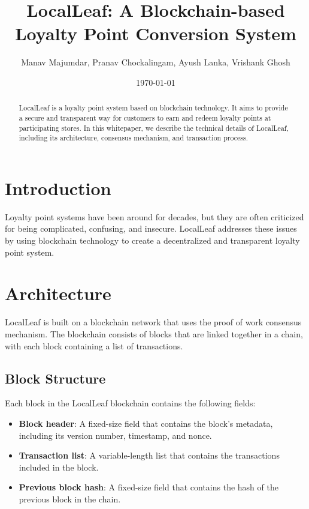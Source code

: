 \documentclass{article}
\title{LocalLeaf: A Blockchain-based Loyalty Point Conversion System}
\author{Manav Majumdar, Pranav Chockalingam, Ayush Lanka, Vrishank Ghosh}
\date{\today}
\begin{document}
\maketitle

\begin{abstract}
    LocalLeaf is a loyalty point system based on blockchain technology. It aims to provide a secure and transparent way for customers to earn and redeem loyalty points at participating stores. In this whitepaper, we describe the technical details of LocalLeaf, including its architecture, consensus mechanism, and transaction process.
\end{abstract}

\section{Introduction}

Loyalty point systems have been around for decades, but they are often criticized for being complicated, confusing, and insecure. LocalLeaf addresses these issues by using blockchain technology to create a decentralized and transparent loyalty point system.

\section{Architecture}

LocalLeaf is built on a blockchain network that uses the proof of work consensus mechanism. The blockchain consists of blocks that are linked together in a chain, with each block containing a list of transactions.

\subsection{Block Structure}

Each block in the LocalLeaf blockchain contains the following fields:

\begin{itemize}
    \item \textbf{Block header}: A fixed-size field that contains the block's metadata, including its version number, timestamp, and nonce.
    \item \textbf{Transaction list}: A variable-length list that contains the transactions included in the block.
    \item \textbf{Previous block hash}: A fixed-size field that contains the hash of the previous block in the chain.
\end{itemize}
\end{document}
